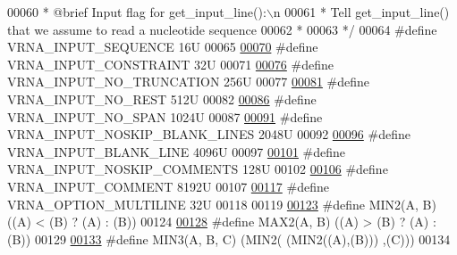 \begin{DoxyCode}
00060 \textcolor{comment}{ *  @brief  Input flag for get\_input\_line():\(\backslash\)n}
00061 \textcolor{comment}{ *  Tell get\_input\_line() that we assume to read a nucleotide sequence}
00062 \textcolor{comment}{ * }
00063 \textcolor{comment}{ */}
00064 \textcolor{preprocessor}{#define VRNA\_INPUT\_SEQUENCE               16U}
00065 
\hypertarget{utils_8h_source_l00070}{}\hyperlink{group__utils_gac08a9df45b9721b97a47dbfe7a6e5f85}{00070} \textcolor{preprocessor}{#define VRNA\_INPUT\_CONSTRAINT             32U}
00071 
\hypertarget{utils_8h_source_l00076}{}\hyperlink{group__utils_ga086742158293217a46ae2f71bb296937}{00076} \textcolor{preprocessor}{#define VRNA\_INPUT\_NO\_TRUNCATION          256U}
00077 
\hypertarget{utils_8h_source_l00081}{}\hyperlink{group__utils_ga7a2e8c50a0c7ce82e60da1016e1367fd}{00081} \textcolor{preprocessor}{#define VRNA\_INPUT\_NO\_REST                512U}
00082 
\hypertarget{utils_8h_source_l00086}{}\hyperlink{group__utils_ga0de536599b881c787b0943a2671da476}{00086} \textcolor{preprocessor}{#define VRNA\_INPUT\_NO\_SPAN                1024U}
00087 
\hypertarget{utils_8h_source_l00091}{}\hyperlink{group__utils_gab4db885222b3b69608310d7c7e63e286}{00091} \textcolor{preprocessor}{#define VRNA\_INPUT\_NOSKIP\_BLANK\_LINES     2048U}
00092 
\hypertarget{utils_8h_source_l00096}{}\hyperlink{group__utils_ga305474b93ccb79ae4c7754016a8ddd84}{00096} \textcolor{preprocessor}{#define VRNA\_INPUT\_BLANK\_LINE             4096U}
00097 
\hypertarget{utils_8h_source_l00101}{}\hyperlink{group__utils_ga0f6311f11bed1842e3a527ab27b294c6}{00101} \textcolor{preprocessor}{#define VRNA\_INPUT\_NOSKIP\_COMMENTS        128U}
00102 
\hypertarget{utils_8h_source_l00106}{}\hyperlink{group__utils_gaf2062e0eeefffd3ed639af460b3d4fab}{00106} \textcolor{preprocessor}{#define VRNA\_INPUT\_COMMENT                8192U}
00107 
\hypertarget{utils_8h_source_l00117}{}\hyperlink{group__utils_gabec89c09874528c6cb73140a4c3d86d7}{00117} \textcolor{preprocessor}{#define VRNA\_OPTION\_MULTILINE             32U}
00118 
00119 
\hypertarget{utils_8h_source_l00123}{}\hyperlink{group__utils_gae0b9cd0ce090bd69b951aa73e8fa4f7d}{00123} \textcolor{preprocessor}{#define MIN2(A, B)      ((A) < (B) ? (A) : (B))}
00124 
\hypertarget{utils_8h_source_l00128}{}\hyperlink{group__utils_ga33297b3679c713b0c4d897cd0fe3b122}{00128} \textcolor{preprocessor}{#define MAX2(A, B)      ((A) > (B) ? (A) : (B))}
00129 
\hypertarget{utils_8h_source_l00133}{}\hyperlink{group__utils_ga721b8d5f3abef17f10293f1f7f8c958e}{00133} \textcolor{preprocessor}{#define MIN3(A, B, C)   (MIN2(  (MIN2((A),(B))) ,(C)))}
00134 

\end{DoxyCode}

